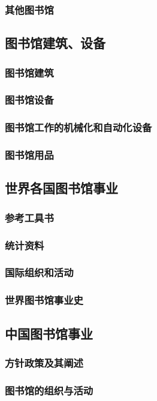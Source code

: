 \documentclass[UTF8]{../../ApplicationUniverse}
\begin{document}
    \subsubsection{其他图书馆}
\subsection{图书馆建筑、设备}
    \subsubsection{图书馆建筑}
    \subsubsection{图书馆设备}
    \subsubsection{图书馆工作的机械化和自动化设备}
    \subsubsection{图书馆用品}

\subsection{世界各国图书馆事业}
    \subsubsection{参考工具书}
    \subsubsection{统计资料}
    \subsubsection{国际组织和活动}
    \subsubsection{世界图书馆事业史}

\subsection{中国图书馆事业}
    \subsubsection{方针政策及其阐述}
    \subsubsection{图书馆的组织与活动}
\end{document}
